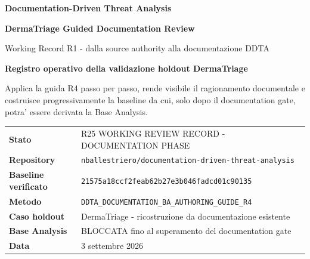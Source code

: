 \documentclass[11pt,a4paper]{article}
\begin{document}

\begin{titlepage}
\thispagestyle{empty}
\vspace*{8mm}

{\sffamily\bfseries\color{DDTANavy}\fontsize{15}{18}\selectfont Documentation-Driven Threat Analysis}\par
\vspace{5mm}
{\sffamily\bfseries\color{DDTANavy}\fontsize{29}{33}\selectfont DermaTriage Guided Documentation Review}\par
\vspace{2mm}
{\sffamily\color{DDTABlue}\fontsize{18}{22}\selectfont Working Record R1 - dalla source authority alla documentazione DDTA}\par

\vspace{10mm}
\begin{tcolorbox}[enhanced,arc=3pt,boxrule=0pt,colback=DDTANavy,left=12pt,right=12pt,top=11pt,bottom=11pt]
{\color{white}\sffamily\bfseries\large Registro operativo della validazione holdout DermaTriage}\par
\vspace{2mm}
{\color{white!88}\small Applica la guida R4 passo per passo, rende visibile il ragionamento documentale e costruisce progressivamente la baseline da cui, solo dopo il documentation gate, potra' essere derivata la Base Analysis.}
\end{tcolorbox}

\vspace{8mm}
\begin{tabularx}{\textwidth}{L{42mm}Y}
\toprule
\textbf{Stato} & R25 WORKING REVIEW RECORD - DOCUMENTATION PHASE \\
\textbf{Repository} & \texttt{nballestriero/documentation-driven-threat-analysis} \\
\textbf{Baseline verificato} & \texttt{21575a18ccf2feab62b27e3b046fadcd01c90135} \\
\textbf{Metodo} & \texttt{DDTA\_DOCUMENTATION\_BA\_AUTHORING\_GUIDE\_R4} \\
\textbf{Caso holdout} & DermaTriage - ricostruzione da documentazione esistente \\
\textbf{Base Analysis} & BLOCCATA fino al superamento del documentation gate \\
\textbf{Data} & 3 settembre 2026 \\
\bottomrule
\end{tabularx}


\end{titlepage}
\end{document}

